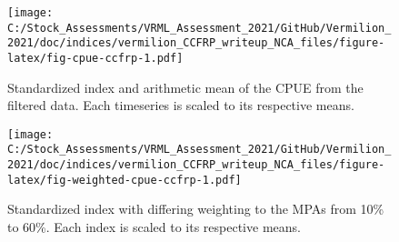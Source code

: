 \documentclass[
]{article}
\begin{document}
\begin{figure}
\centering
\texttt{[image: C:/Stock\_Assessments/VRML\_Assessment\_2021/GitHub/Vermilion\_2021/doc/indices/vermilion\_CCFRP\_writeup\_NCA\_files/figure-latex/fig-cpue-ccfrp-1.pdf]}
\caption{\label{fig:fig-cpue-ccfrp}Standardized index and arithmetic mean of the CPUE from the filtered data. Each timeseries is scaled to its respective means.}
\end{figure}

\begin{figure}
\centering
\texttt{[image: C:/Stock\_Assessments/VRML\_Assessment\_2021/GitHub/Vermilion\_2021/doc/indices/vermilion\_CCFRP\_writeup\_NCA\_files/figure-latex/fig-weighted-cpue-ccfrp-1.pdf]}
\caption{\label{fig:fig-weighted-cpue-ccfrp}Standardized index with differing weighting to the MPAs from 10\% to 60\%. Each index is scaled to its respective means.}
\end{figure}
\end{document}
